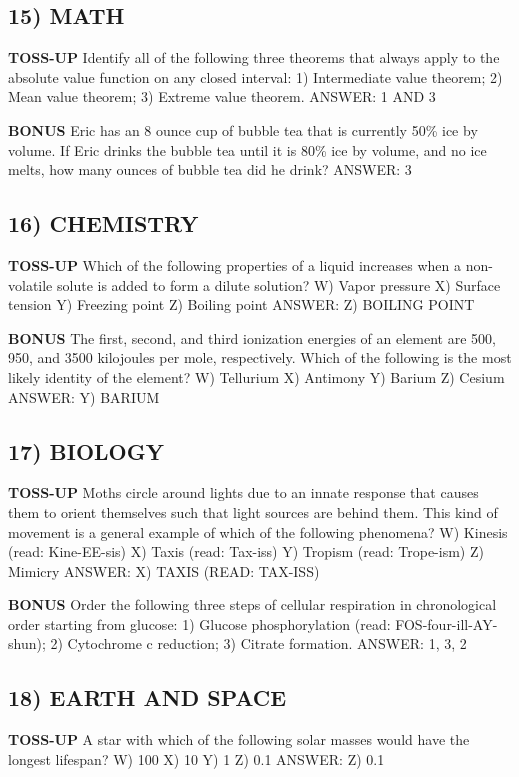 \documentclass{article}
\begin{document}
\subsection*{15) MATH}
\textbf{TOSS-UP}
Identify all of the following three theorems that always apply to the absolute value function on any closed interval: 1) Intermediate value theorem; 2) Mean value theorem; 3) Extreme value theorem.
ANSWER: 1 AND 3

\textbf{BONUS}
Eric has an 8 ounce cup of bubble tea that is currently 50\% ice by volume. If Eric drinks the bubble tea until it is 80\% ice by volume, and no ice melts, how many ounces of bubble tea did he drink?
ANSWER: 3

\subsection*{16) CHEMISTRY}
\textbf{TOSS-UP}
Which of the following properties of a liquid increases when a non-volatile solute is added to form a dilute solution?
W) Vapor pressure
X) Surface tension
Y) Freezing point
Z) Boiling point
ANSWER: Z) BOILING POINT

\textbf{BONUS}
The first, second, and third ionization energies of an element are 500, 950, and 3500 kilojoules per mole, respectively. Which of the following is the most likely identity of the element?
W) Tellurium
X) Antimony
Y) Barium
Z) Cesium
ANSWER: Y) BARIUM

\subsection*{17) BIOLOGY}
\textbf{TOSS-UP}
Moths circle around lights due to an innate response that causes them to orient themselves such that light sources are behind them. This kind of movement is a general example of which of the following phenomena?
W) Kinesis (read: Kine-EE-sis)
X) Taxis (read: Tax-iss)
Y) Tropism (read: Trope-ism)
Z) Mimicry
ANSWER: X) TAXIS (READ: TAX-ISS)

\textbf{BONUS}
Order the following three steps of cellular respiration in chronological order starting from glucose: 1) Glucose phosphorylation (read: FOS-four-ill-AY-shun); 2) Cytochrome c reduction; 3) Citrate formation.
ANSWER: 1, 3, 2

\subsection*{18) EARTH AND SPACE}
\textbf{TOSS-UP}
A star with which of the following solar masses would have the longest lifespan?
W) 100
X) 10
Y) 1
Z) 0.1
ANSWER: Z) 0.1
\end{document}
